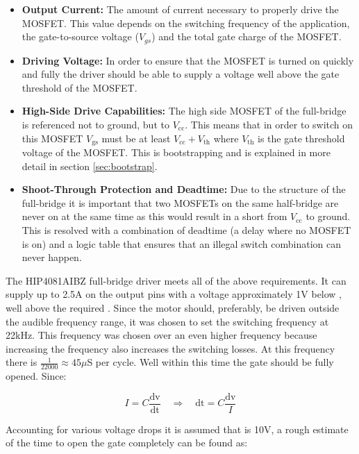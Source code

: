 \begin{itemize}
	\item \textbf{Output Current:} The amount of current necessary to properly drive the MOSFET.
	This value depends on the switching frequency of the application, the gate-to-source voltage ($V_{gs}$) and the total gate charge of the MOSFET.
	\item \textbf{Driving Voltage:} In order to ensure that the MOSFET is turned on quickly and fully the driver should be able to supply a voltage well above the gate threshold of the MOSFET.
	\item \textbf{High-Side Drive Capabilities:} The high side MOSFET of the full-bridge is referenced not to ground, but to $V_{\text{cc}}$.
	This means that in order to switch on this MOSFET $V_{\text{gs}}$ must be at least $V_{\text{cc}}+V_{\text{th}}$ where $V_{\text{th}}$ is the gate threshold voltage of the MOSFET.
	This is bootstrapping and is explained in more detail in section \ref{sec:bootstrap}.
	\item \textbf{Shoot-Through Protection and Deadtime:} Due to the structure of the full-bridge it is important that two MOSFETs on the same half-bridge are never on at the same time as this would result in a short from $V_{\text{cc}}$ to ground.
	This is resolved with a combination of deadtime (a delay where no MOSFET is on) and a logic table that ensures that an illegal switch combination can never happen.
\end{itemize}

The HIP4081AIBZ \cite{driver} full-bridge driver meets all of the above requirements.
It can supply up to 2.5A on the output pins with a voltage approximately 1V below \vcc, well above the required \vth.
Since the motor should, preferably, be driven outside the audible frequency range, it was chosen to set the switching frequency at 22kHz.
This frequency was chosen over an even higher frequency because increasing the frequency also increases the switching losses.
At this frequency there is $\frac{1}{22000}\approx45\mu$S per cycle. 
Well within this time the gate should be fully opened.
Since:

\begin{equation}
	I = C\frac{\text{dv}}{\text{dt}} \quad\Rightarrow\quad \text{dt} = C\frac{\text{dv}}{I}
\end{equation}

Accounting for various voltage drops it is assumed that \vgs is 10V, a rough estimate of the time to open the gate completely can be found as:

